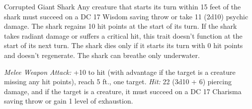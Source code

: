 \documentclass[10pt,a4paper,twoside,twocolumn,openany,bg=none,nodeprecatedcode]{dndbook}
\begin{document}
\begin{DndMonster}[float*=t]{Corrupted Giant Shark}
\DndMonsterBasics[
armor-class = {13 (natural armor)},
hit-points = {\DndDice{11d12 + 55}},
speed = {0 ft., 50 ft. (key)}
]
\DndMonsterAbilityScores[
 str = 23,
 dex = 11,
 con = 21,
 int = 1,
 wis = 10,
 cha = 5
]
\DndMonsterDetails[
skills = {Perception +4},
senses = {blindsight 60 ft., passive perception 14},
challenge = 9,
]
Any creature that starts its turn within 15 feet of the shark must succeed on a DC 17 Wisdom saving throw or take 11 (2d10) psychic damage.
The shark regains 10 hit points at the start of its turn. If the shark takes radiant damage or suffers a critical hit, this trait doesn't function at the start of its next turn. The shark dies only if it starts its turn with 0 hit points and doesn't regenerate.
The shark can breathe only underwater.
\par
{}
\textsl{Melee Weapon Attack:} +10 to hit (with advantage if the target is a creature missing any hit points), reach 5 ft., one target. \textsl{Hit:} 22 (3d10 + 6) piercing damage, and if the target is a creature, it must succeed on a DC 17 Charisma saving throw or gain 1 level of exhaustion.
\end{DndMonster}
\end{document}
